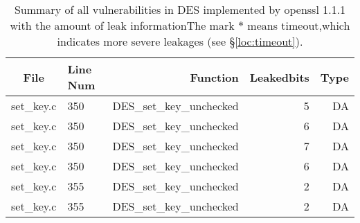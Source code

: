 \begin{table*}%
\centering
\caption{Summary of all vulnerabilities in DES implemented by openssl 1.1.1 with the amount of leak informationThe mark $*$ means timeout,which indicates more severe leakages (see \S\ref{loc:timeout}).}\label{tab:DESopenssl}
\begin{tabular}{clrrr}
\hline
\textbf{File} & \textbf{Line Num} & \textbf{Function} & \textbf{Leakedbits} & \textbf{Type} \\\hline
set\_key.c&350&DES\_set\_key\_unchecked&5 &DA\\
set\_key.c&350&DES\_set\_key\_unchecked&6 &DA\\
set\_key.c&350&DES\_set\_key\_unchecked&7 &DA\\
set\_key.c&350&DES\_set\_key\_unchecked&6 &DA\\
set\_key.c&355&DES\_set\_key\_unchecked&2 &DA\\
set\_key.c&355&DES\_set\_key\_unchecked&2 &DA\\
\hline
\end{tabular}
\end{table*}